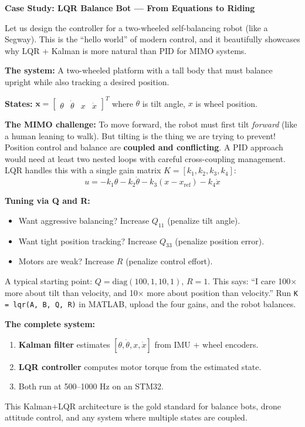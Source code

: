 \vspace{0.5em}
\begin{mdframed}[linewidth=1pt, innertopmargin=10pt, innerbottommargin=10pt]
\textbf{Case Study: LQR Balance Bot --- From Equations to Riding}

\vspace{0.3em}
Let us design the controller for a two-wheeled self-balancing robot (like a Segway). This is the ``hello world'' of modern control, and it beautifully showcases why LQR + Kalman is more natural than PID for MIMO systems.

\textbf{The system:} A two-wheeled platform with a tall body that must balance upright while also tracking a desired position.

\textbf{States:} $\mathbf{x} = \begin{bmatrix} \theta & \dot{\theta} & x & \dot{x} \end{bmatrix}^T$ where $\theta$ is tilt angle, $x$ is wheel position.

\textbf{The MIMO challenge:} To move forward, the robot must first tilt \textit{forward} (like a human leaning to walk). But tilting is the thing we are trying to prevent! Position control and balance are \textbf{coupled and conflicting}. A PID approach would need at least two nested loops with careful cross-coupling management. LQR handles this with a single gain matrix $K = [k_1, k_2, k_3, k_4]$:
\[
u = -k_1 \theta - k_2 \dot{\theta} - k_3 (x - x_{\text{ref}}) - k_4 \dot{x}
\]

\textbf{Tuning via Q and R:}
\begin{itemize}[nosep]
    \item Want aggressive balancing? Increase $Q_{11}$ (penalize tilt angle).
    \item Want tight position tracking? Increase $Q_{33}$ (penalize position error).
    \item Motors are weak? Increase $R$ (penalize control effort).
\end{itemize}

A typical starting point: $Q = \text{diag}(100, 1, 10, 1)$, $R = 1$. This says: ``I care 100$\times$ more about tilt than velocity, and 10$\times$ more about position than velocity.'' Run \texttt{K = lqr(A, B, Q, R)} in MATLAB, upload the four gains, and the robot balances.

\textbf{The complete system:}
\begin{enumerate}[nosep]
    \item \textbf{Kalman filter} estimates $[\theta, \dot{\theta}, x, \dot{x}]$ from IMU + wheel encoders.
    \item \textbf{LQR controller} computes motor torque from the estimated state.
    \item Both run at 500--1000 Hz on an STM32.
\end{enumerate}

This Kalman+LQR architecture is the gold standard for balance bots, drone attitude control, and any system where multiple states are coupled.
\end{mdframed}


